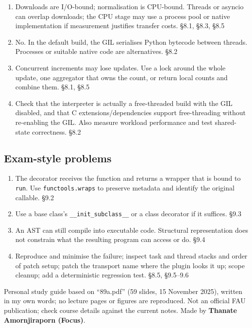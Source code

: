 \documentclass[11pt]{article}
\begin{document}
\begin{keepsection}
\begin{keepsection}
\begin{enumerate}
\item Downloads are I/O-bound; normalisation is CPU-bound. Threads or asyncio can overlap downloads; the CPU stage may use a process pool or native implementation if measurement justifies transfer costs. \hfill{\small\color{FAUblue}§8.1, §8.3, §8.5}
\item No. In the default build, the GIL serialises Python bytecode between threads. Processes or suitable native code are alternatives. \hfill{\small\color{FAUblue}§8.2}
\item Concurrent increments may lose updates. Use a lock around the whole update, one aggregator that owns the count, or return local counts and combine them. \hfill{\small\color{FAUblue}§8.1, §8.5}
\item Check that the interpreter is actually a free-threaded build with the GIL disabled, and that C extensions/dependencies support free-threading without re-enabling the GIL. Also measure workload performance and test shared-state correctness. \hfill{\small\color{FAUblue}§8.2}
\end{enumerate}

\end{keepsection}
\begin{keepsection}\subsection{Exam-style problems}

\begin{enumerate}
\item The decorator receives the function and returns a wrapper that is bound to \texttt{run}. Use \texttt{functools.wraps} to preserve metadata and identify the original callable. \hfill{\small\color{FAUblue}§9.2}
\item Use a base class’s \texttt{\_\_init\_subclass\_\_} or a class decorator if it suffices. \hfill{\small\color{FAUblue}§9.3}
\item An AST can still compile into executable code. Structural representation does not constrain what the resulting program can access or do. \hfill{\small\color{FAUblue}§9.4}
\item Reproduce and minimise the failure; inspect task and thread stacks and order of patch setup; patch the transport name where the plugin looks it up; scope cleanup; add a deterministic regression test. \hfill{\small\color{FAUblue}§8.5, §9.5–9.6}
\end{enumerate}

\end{keepsection}

\vfill{\small Personal study guide based on “89a.pdf” (59 slides, 15 November 2025), written in my own words; no lecture pages or figures are reproduced. Not an official FAU publication; check course details against the current notes. Made by \textbf{Thanate Amornjiraporn (Focus)}.}
\end{keepsection}
\end{document}
